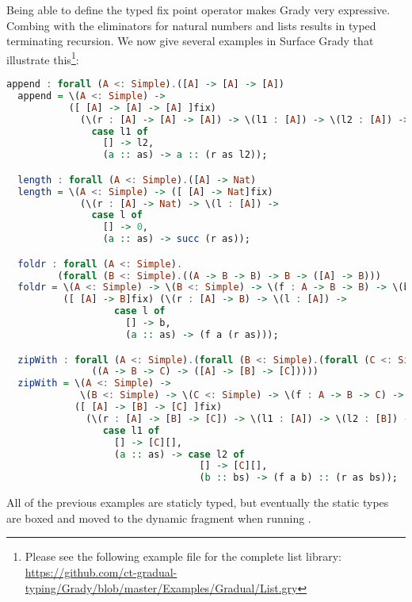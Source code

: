 Being able to define the typed fix point operator makes Grady very
expressive.  Combing  with the eliminators for natural
numbers and lists results in typed terminating recursion.  We now give
several examples in Surface Grady that illustrate this\footnote{Please
  see the following example file for the complete list library:
  \url{https://github.com/ct-gradual-typing/Grady/blob/master/Examples/Gradual/List.gry}}:
\begin{lstlisting}[language=Haskell]
  append : forall (A <: Simple).([A] -> [A] -> [A])
  append = \(A <: Simple) ->
           ([ [A] -> [A] -> [A] ]fix)
             (\(r : [A] -> [A] -> [A]) -> \(l1 : [A]) -> \(l2 : [A]) ->
               case l1 of
                 [] -> l2,
                 (a :: as) -> a :: (r as l2));

  length : forall (A <: Simple).([A] -> Nat)
  length = \(A <: Simple) -> ([ [A] -> Nat]fix)
             (\(r : [A] -> Nat) -> \(l : [A]) ->
               case l of
                 [] -> 0,
                 (a :: as) -> succ (r as));

  foldr : forall (A <: Simple).
         (forall (B <: Simple).((A -> B -> B) -> B -> ([A] -> B)))
  foldr = \(A <: Simple) -> \(B <: Simple) -> \(f : A -> B -> B) -> \(b : B) ->
          ([ [A] -> B]fix) (\(r : [A] -> B) -> \(l : [A]) ->
                   case l of
                     [] -> b,
                     (a :: as) -> (f a (r as)));

  zipWith : forall (A <: Simple).(forall (B <: Simple).(forall (C <: Simple).
               ((A -> B -> C) -> ([A] -> [B] -> [C]))))
  zipWith = \(A <: Simple) ->
             \(B <: Simple) -> \(C <: Simple) -> \(f : A -> B -> C) ->
            ([ [A] -> [B] -> [C] ]fix)
              (\(r : [A] -> [B] -> [C]) -> \(l1 : [A]) -> \(l2 : [B]) ->
                 case l1 of
                   [] -> [C][],
                   (a :: as) -> case l2 of
                                  [] -> [C][],
                                  (b :: bs) -> (f a b) :: (r as bs));
\end{lstlisting}
All of the previous examples are staticly typed, but eventually the
static types are boxed and moved to the dynamic fragment when running
.
